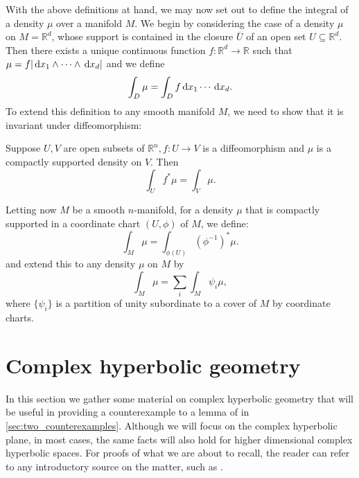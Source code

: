 \documentclass{report}
\begin{document}
With the above definitions at hand, we may now set out to define the integral of a density $\mu$ over a manifold $M$.
We begin by considering the case of a density $\mu$ on $M = \mathbb R^d$, whose support is contained in the closure $\overline{U}$ of an open set $U \subseteq \mathbb R^d$.
Then there exists a unique continuous function $f: \mathbb R^d \to \mathbb R$ such that $\mu = f |\,\mathrm{d} x_1 \wedge \cdots \wedge \,\mathrm{d} x_d|$ and we define
\[
\int_D \mu = \int_D f \,\mathrm{d} x_1 \cdots \,\mathrm{d} x_d.
\]
To extend this definition to any smooth manifold $M$, we need to show that it is invariant under diffeomorphism:
\begin{proposition}
    Suppose $U, V$ are open subsets of $\mathbb R^n, f: U \to V$ is a diffeomorphism and $\mu$ is a compactly supported density on $V$.
    Then
    \[
    \int_U f^*\mu = \int_V \mu.
    \]
\end{proposition}
Letting now $M$ be a smooth $n$-manifold, for a density $\mu$ that is compactly supported in a coordinate chart $(U, \phi)$ of $M$, we define:
\[
\int_M \mu = \int_{\phi(U)} (\phi^{-1})^*\mu.
\]
and extend this to any density $\mu$ on $M$ by
\[
\int_M \mu = \sum_{i} \int_M \psi_i \mu,
\]
where $\{\psi_i\}$ is a partition of unity subordinate to a cover of $M$ by coordinate charts.

\section{Complex hyperbolic geometry}\label{sec:complex_geometry}
In this section we gather some material on complex hyperbolic geometry that will be useful in providing a counterexample to a lemma of \cite{pozzetti_anosov_2023} in \cref{sec:two_counterexamples}.
Although we will focus on the complex hyperbolic plane, in most cases, the same facts will also hold for higher dimensional complex hyperbolic spaces.
For proofs of what we are about to recall, the reader can refer to any introductory source on the matter, such as \cite{parker2003notes}.
\end{document}
